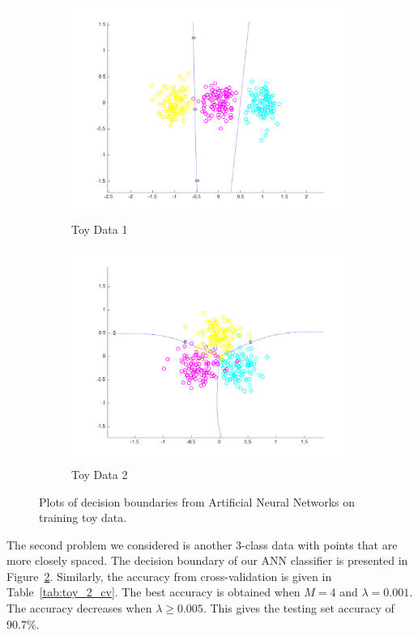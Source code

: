 \begin{figure}[h!]
\centering
    \begin{subfigure}[b]{0.45\textwidth}
	\includegraphics[height=70mm]{plot_toy_multiclass_1.pdf}
	\caption{Toy Data 1}\label{fig:toy_1}
    \end{subfigure}
    \quad
    \begin{subfigure}[b]{0.45\textwidth}
	\includegraphics[height=70mm]{plot_toy_multiclass_2.pdf}
	\caption{Toy Data 2}\label{fig:toy_2}
	\end{subfigure}
    \caption{Plots of decision boundaries from Artificial Neural Networks on training toy data.}  \label{fig:LR_plots}  
\end{figure}

The second problem we considered is another 3-class data with points that are more closely spaced. The decision boundary of our ANN classifier is presented in Figure~\ref{fig:toy_2}. Similarly, the accuracy from cross-validation is given in Table~\ref{tab:toy_2_cv}. The best accuracy is obtained when $M = 4$ and $\lambda = 0.001$. The accuracy decreases when $\lambda \geq 0.005$. This gives the testing set accuracy of $90.7\%$.


